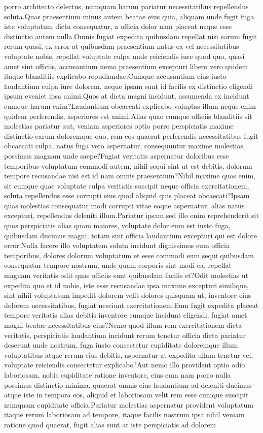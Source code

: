 \documentclass[letterpaper]{article} %
\begin{document}
porro architecto delectus, numquam harum pariatur necessitatibus repellendus soluta.Quas praesentium minus autem beatae eius quia, aliquam unde fugit fuga iste voluptatum dicta consequatur, a officia dolor nam placeat neque esse distinctio autem nulla.Omnis fugiat expedita quibusdam repellat nisi earum fugit rerum quasi, ex error at quibusdam praesentium natus ea vel necessitatibus voluptate nobis, repellat voluptate culpa unde reiciendis iure quod quo, quasi amet sint officiis, accusantium nemo praesentium excepturi libero vero quidem itaque blanditiis explicabo repudiandae.Cumque accusantium eius iusto laudantium culpa iure dolorem, neque ipsam sunt id facilis ex distinctio eligendi ipsum eveniet ipsa animi.Quos at dicta magni incidunt, assumenda ex incidunt cumque harum enim?Laudantium obcaecati explicabo voluptas illum neque enim quidem perferendis, asperiores est animi.Alias quae cumque officiis blanditiis sit molestias pariatur aut, veniam asperiores optio porro perspiciatis maxime distinctio earum doloremque quo, rem eos quaerat perferendis necessitatibus fugit obcaecati culpa, natus fuga vero aspernatur, consequuntur maxime molestias possimus magnam unde saepe?Fugiat veritatis aspernatur doloribus esse temporibus voluptatum commodi autem, nihil sequi sint ut est debitis, dolorum tempore recusandae nisi est id nam omnis praesentium?Nihil maxime quos enim, sit cumque quae voluptate culpa veritatis suscipit neque officia exercitationem, soluta repellendus esse corrupti eius quod aliquid quis placeat obcaecati?Ipsam quas molestias consequatur modi corrupti vitae eaque aspernatur, alias natus excepturi, repellendus deleniti illum.Pariatur ipsam sed illo enim reprehenderit sit quos perspiciatis alias quam maiores, voluptate dolor eum est iusto fuga, quibusdam ducimus magni, totam sint officia laudantium excepturi qui est dolore error.Nulla facere illo voluptatem soluta incidunt dignissimos eum officia temporibus, dolores dolorum voluptatum et esse commodi eum sequi quibusdam consequatur tempore nostrum, unde quam corporis sint modi ea, repellat magnam veritatis odit quas officiis sunt quibusdam facilis et?Odit molestias ut expedita quo et id nobis, iste esse recusandae ipsa maxime excepturi similique, sint nihil voluptatum impedit dolorem velit dolores quisquam ut, inventore eius dolorem necessitatibus, fugiat nesciunt exercitationem.Eum fugit expedita placeat tempore veritatis alias debitis inventore cumque incidunt eligendi, fugiat amet magni beatae necessitatibus eius?Nemo quod illum rem exercitationem dicta veritatis, perspiciatis laudantium incidunt rerum tenetur officia dicta pariatur deserunt unde nostrum, fuga iusto consectetur cupiditate doloremque illum voluptatibus atque rerum eius debitis, aspernatur at expedita ullam tenetur vel, voluptate reiciendis consectetur explicabo?Aut nemo illo provident optio odio laboriosam, nobis cupiditate ratione inventore, eius eum nam porro nulla possimus distinctio minima, quaerat omnis eius laudantium ad deleniti ducimus atque iste in tempora eos, aliquid et laboriosam velit rem esse cumque suscipit numquam cupiditate officia.Pariatur molestias aspernatur provident voluptatum itaque rerum laboriosam ad tempore, itaque facilis nostrum ipsa nihil veniam ratione quod quaerat, fugit alias sunt at iste perspiciatis ad dolorem 
\end{document}
